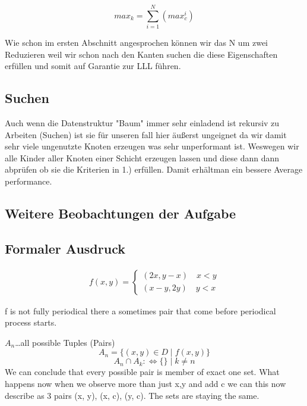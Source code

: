 \documentclass{article}
\begin{document}
\begin{equation}
	max_k =  \sum \limits_{i=1}^N  (max_c ^ i)
\end{equation}

Wie schon im ersten Abschnitt angesprochen können wir das N um zwei Reduzieren weil wir schon nach den Kanten suchen die diese Eigenschaften erfüllen und somit auf Garantie zur LLL führen.

\subsection*{ Suchen }

Auch wenn die Datenstruktur "Baum" immer sehr einladend ist rekursiv zu Arbeiten (Suchen) ist sie für unseren fall hier äußerst ungeignet da wir damit sehr viele ungenutzte Knoten erzeugen was sehr unperformant ist. Weswegen wir alle Kinder aller Knoten einer Schicht erzeugen lassen und diese dann dann abprüfen ob sie die Kriterien in 1.) erfüllen. Damit erhältman ein bessere Average performance.


\subsection*{ Weitere Beobachtungen der Aufgabe }

\subsection*{ Formaler Ausdruck }


\begin{gather}
    f(x, y) =  
    \begin{cases}
    	(2x, y - x)		\quad x < y \\
    	(x - y, 2y) 		\quad y < x
    \end{cases}
\end{gather}

f is not fully periodical there a sometimes pair that come before periodical process starts. \newline

\(A_n\)\dots all possible Tuples (Pairs)
\begin{equation}
	A_n = \lbrace (x, y) \in D \mid f(x, y) \rbrace
\end{equation}
\begin{equation}
	A_n \cap A_k :\Longleftrightarrow \lbrace \rbrace \mid k \neq n
\end{equation}
We can conclude that every possible pair is member of exact one set. What happens now when we observe more than just x,y and add c we can this now describe as 3 pairs (x, y), (x, c), (y, c). The sets are staying the same. \newline
\end{document}
